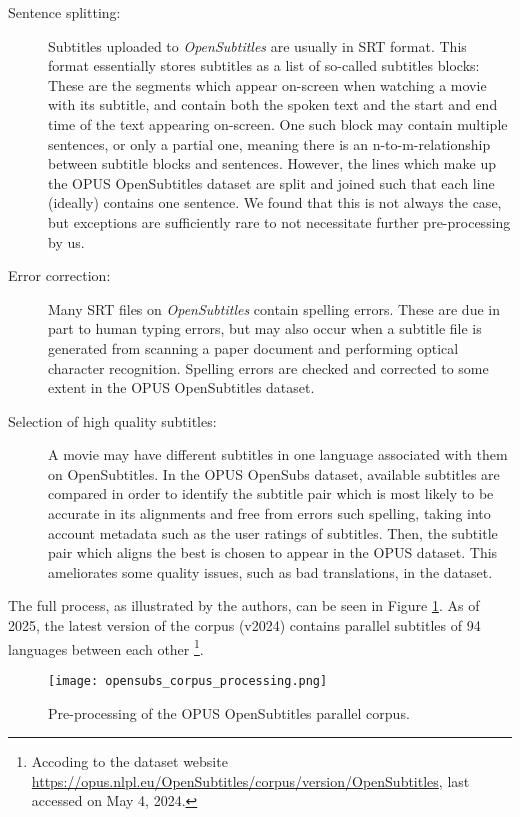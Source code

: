 \begin{description}
	\item [Sentence splitting:]
	      Subtitles uploaded to \textit{OpenSubtitles} are usually in SRT format.
	      This format essentially stores subtitles as a list of so-called subtitles blocks:
	      These are the segments which appear on-screen when watching a movie with its subtitle, and contain both the spoken text and the start and end time of the text appearing on-screen.
	      One such block may contain multiple sentences, or only a partial one, meaning there is an n-to-m-relationship between subtitle blocks and sentences.
	      However, the lines which make up the OPUS OpenSubtitles dataset are split and joined such that each line (ideally) contains one sentence.
	      We found that this is not always the case, but exceptions are sufficiently rare to not necessitate further pre-processing by us.
	\item [Error correction:] Many SRT files on \textit{OpenSubtitles} contain spelling errors.
	      These are due in part to human typing errors, but may also occur when a subtitle file is generated from scanning a paper document and performing optical character recognition.
	      Spelling errors are checked and corrected to some extent in the OPUS OpenSubtitles dataset.
	\item [Selection of high quality subtitles:]
	      A movie may have different subtitles in one language associated with them on OpenSubtitles.
	      In the OPUS OpenSubs dataset, available subtitles are compared in order to identify the subtitle pair which is most likely to be accurate in its alignments and free from errors such spelling, taking into account metadata such as the user ratings of subtitles.
	      Then, the subtitle pair which aligns the best is chosen to appear in the OPUS dataset.
	      This ameliorates some quality issues, such as bad translations, in the dataset.
\end{description}

The full process, as illustrated by the authors, can be seen in Figure \ref{fig:opensubtitles-pipeline}.
As of 2025, the latest version of the corpus (v2024) contains parallel subtitles of 94 languages between each other \footnote{Accoding to the dataset website \url{https://opus.nlpl.eu/OpenSubtitles/corpus/version/OpenSubtitles}, last accessed on May 4, 2024.}.

\begin{figure}[ht]
	\centering
	\texttt{[image: opensubs\_corpus\_processing.png]}
	\caption{Pre-processing of the OPUS OpenSubtitles parallel corpus.}
	\label{fig:opensubtitles-pipeline}
\end{figure}

